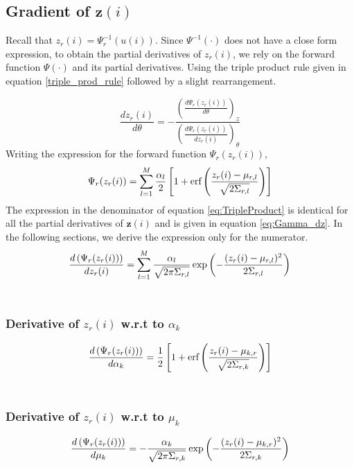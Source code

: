 \documentclass[]{article}
\begin{document}
\subsection{Gradient of $\textbf{z}(i) $}
Recall that $z_r(i)=\Psi_r^{-1}(u(i))$. Since $\Psi^{-1}(\cdot)$ does not have a close form expression, to obtain the partial derivatives of $z_r(i)$, we rely on the forward function $\Psi(\cdot)$ and its partial derivatives. Using the triple product rule given in equation \ref{triple_prod_rule} followed by a slight rearrangement.

\begin{equation}\label{eq:TripleProduct}
\frac{dz_r(i)}{d\theta}=- \frac{\left(\frac{d\Psi_r(z_r(i))}{d\theta}\right)_z}{\left(\frac{d\Psi_r(z_r(i))}{dz_r(i)}\right)_\theta}
\end{equation}
Writing the expression for the forward function $\Psi_r(z_r(i))$,
\begin{equation}
\Psi_r(z_r(i))=\sum\limits_{l=1}^{M}\frac{\alpha_l}{2}\left[1+ \erf \left( \frac{z_r(i)-\mu_{r,l}}{\sqrt{2\Sigma_{r,l}}}\right) \right]
\end{equation}
The expression in the denominator of equation \ref{eq:TripleProduct} is identical for all the partial derivatives of $\textbf{z}(i)$ and is given in equation \ref{eq:Gamma_dz}. In the following sections, we derive the expression only for the numerator.
\begin{equation}\label{eq:Gamma_dz}
\der{z_r(i)}{\Psi_r(z_r(i))}=\sum\limits_{l=1}^{M}\frac{\alpha_l}{\sqrt{2\pi\Sigma_{r,l}}}\exp\left( - \frac{(z_r(i)-\mu_{r,l})^2}{2\Sigma_{r,l}}	 \right)
\end{equation}
\\
\subsubsection*{Derivative of $z_r(i)$ w.r.t to $\alpha_k$}
\begin{equation}
\der{\alpha_k}{\Psi_r(z_r(i))}=\frac{1}{2}\left[1+ \erf \left( \frac{z_r(i)-\mu_{k,r}}{\sqrt{2\Sigma_{r,k}}}\right) \right]
\end{equation}
\\
\subsubsection*{Derivative of $z_r(i)$ w.r.t to $\mu_k$}
\begin{equation}
\der{\mu_k}{\Psi_r(z_r(i))}= -\frac{\alpha_k}{\sqrt{2\pi\Sigma_{r,k}}}\exp\left( - \frac{(z_r(i)-\mu_{k,r})^2}{2\Sigma_{r,k}}	 \right)
\end{equation}
\\
\end{document}
